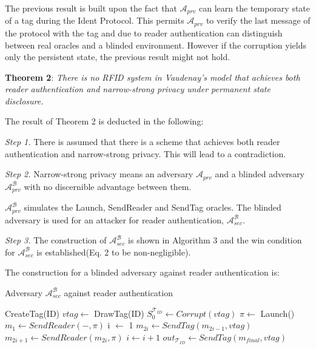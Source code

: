     The previous result is built upon the fact that $\mathcal{A}_{prv}$ can learn the
    temporary state of a tag during the Ident Protocol. This permits $\mathcal{A}_{prv}$
    to verify the last message of the protocol with the tag and due to reader authentication
    can distinguish between real oracles and a blinded environment. However if the corruption
    yields only the persistent state, the previous result might not hold.
    
    \textbf{Theorem 2}: \textit{There is no RFID system in Vaudenay's model that achieves both reader authentication and narrow-strong privacy 
    under permanent state disclosure.}

    The result of Theorem 2 is deducted in the following:

    \textit{Step 1.} There is assumed that there is a scheme that achieves both reader authentication and narrow-strong privacy.
    This will lead to a contradiction.

    \textit{Step 2.} Narrow-strong privacy means an adversary $\mathcal{A}_{prv}$ and a blinded adversary $\mathcal{A}_{prv}^{\mathcal{B}}$  with no discernible
    advantage between them.
    
    $\mathcal{A}_{prv}^{\mathcal{B}}$ simulates the Launch, SendReader and SendTag oracles.
    The blinded adversary is used for an attacker for reader authentication, $\mathcal{A}_{sec}^{\mathcal{B}}$.
    
    \textit{Step 3.} The construction of $\mathcal{A}_{sec}^{\mathcal{B}}$ is shown in Algorithm 3 and the win condition for $\mathcal{A}_{sec}^{\mathcal{B}}$
    is established(Eq. 2 to be non-negligible).

    The construction for a blinded adversary against reader authentication is:
    \begin{algorithm}[H] %
        \centering
        \caption{Adversary $\mathcal{A}_{sec}^{\mathcal{B}}$ against reader authentication}
        \begin{algorithmic}[1] %
            \State CreateTag(ID)
            \State $vtag \leftarrow$ DrawTag(ID)
            \State $S_0^{\mathcal{T}_{ID}} \gets Corrupt(vtag)$
            \State $\pi \leftarrow$ Launch() 
            \State $m_1 \leftarrow SendReader(-,\pi)$ 
            \State i $\leftarrow$ 1
                \State $m_{2i} \gets SendTag(m_{2i-1}, vtag)$ 
                \State $m_{2i+1} \gets SendReader(m_{2i}, \pi)$ 
                \State $i \gets i+1$
            \EndWhile
            \State $out_{\mathcal{T}_{ID}} \gets SendTag(m_{final}, vtag)$ 
        \end{algorithmic}
    \end{algorithm}


